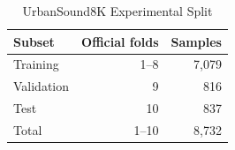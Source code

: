 \begin{table}[t]
  \caption{UrbanSound8K Experimental Split}
  \label{tab:dataset-split}
  \centering
  \begin{tabular}{lrr}
    \toprule
    Subset & Official folds & Samples \\
    \midrule
    Training & 1--8 & 7,079 \\
    Validation & 9 & 816 \\
    Test & 10 & 837 \\
    \midrule
    Total & 1--10 & 8,732 \\
    \bottomrule
  \end{tabular}
\end{table}
